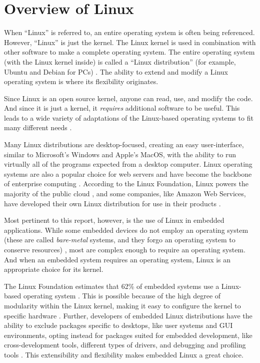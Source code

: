\section*{Overview of Linux}
    When ``Linux'' is referred to, an entire operating system is often being
        referenced.
    However, ``Linux'' is just the kernel.
    The Linux kernel is used in combination with other software to make a
    complete operating system.
    The entire operating system (with the Linux kernel inside) is called a
        ``Linux distribution'' (for example, Ubuntu and Debian for PCs)
        \cite{stallman}.
    The ability to extend and modify a Linux operating system is where its
        flexibility originates.

    Since Linux is an open source kernel, anyone can read, use, and modify the
        code.
    And since it is just a kernel, it \textit{requires} additional software to
        be useful.
    This leads to a wide variety of adaptations of the Linux-based operating
        systems to fit many different needs \cite{comparative-os}.

    Many Linux distributions are desktop-focused, creating an easy
        user-interface, similar to Microsoft's Windows and Apple's MacOS, with
        the ability to run virtually all of the programs expected from a desktop
        computer.
    Linux operating systems are also a popular choice for web servers and have
        become the backbone of enterprise computing \cite{grandview}.
    According to the Linux Foundation, Linux powers the majority of the public
        cloud \cite{linux-public-cloud}, and some companies, like Amazon Web
        Services, have developed their own Linux distribution for use in their
        products \cite{aws-linux}.

    Most pertinent to this report, however, is the use of Linux in embedded
        applications.
    While some embedded devices do not employ an operating system (these are
        called \textit{bare-metal} systems, and they forgo an operating system
        to conserve resources) \cite{bare-metal}, most are complex enough to
        require an operating system.
    And when an embedded system requires an operating system, Linux is an
        appropriate choice for its kernel.

    The Linux Foundation estimates that 62\% of embedded systems use a
        Linux-based operating system \cite{linux-public-cloud}.
    This is possible because of the high degree of modularity within the Linux
        kernel, making it easy to configure the kernel to specific hardware
        \cite{embedded-textbook}.
    Further, developers of embedded Linux distributions have the ability to
        exclude packages specific to desktops, like user systems and GUI
        environments, opting instead for packages suited for embedded development,
        like cross-development tools, different types of drivers, and debugging
        and profiling tools \cite{embedded-textbook}.
    This extensibility and flexibility makes embedded Linux a great choice.
